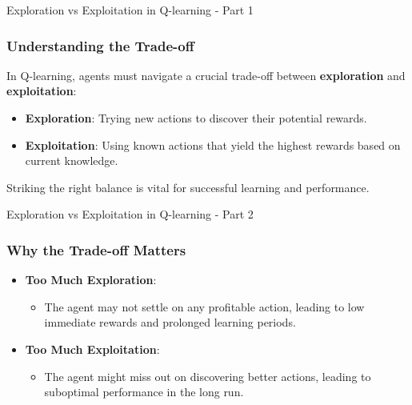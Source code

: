 \documentclass[aspectratio=169]{beamer}
\begin{document}
\begin{frame}[fragile]{Exploration vs Exploitation in Q-learning - Part 1}
    \frametitle{Understanding the Trade-off}
    In Q-learning, agents must navigate a crucial trade-off between \textbf{exploration} and \textbf{exploitation}:
    
    \begin{itemize}
        \item \textbf{Exploration}: Trying new actions to discover their potential rewards.
        \item \textbf{Exploitation}: Using known actions that yield the highest rewards based on current knowledge.
    \end{itemize}
    
    Striking the right balance is vital for successful learning and performance.
\end{frame}

\begin{frame}[fragile]{Exploration vs Exploitation in Q-learning - Part 2}
    \frametitle{Why the Trade-off Matters}
    \begin{itemize}
        \item \textbf{Too Much Exploration}: 
        \begin{itemize}
            \item The agent may not settle on any profitable action, leading to low immediate rewards and prolonged learning periods.
        \end{itemize}
        
        \item \textbf{Too Much Exploitation}:
        \begin{itemize}
            \item The agent might miss out on discovering better actions, leading to suboptimal performance in the long run.
        \end{itemize}
    \end{itemize}
\end{frame}
\end{document}
